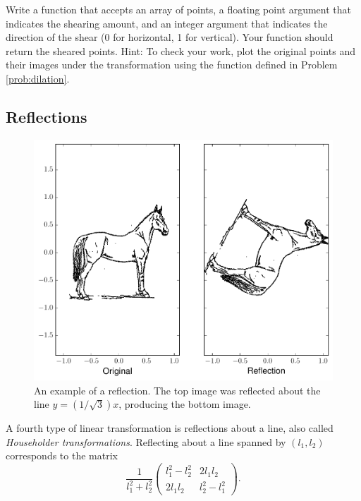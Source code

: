 \begin{problem}
Write a function that accepts an array of points, a floating point argument that indicates the shearing amount, and an integer argument that indicates the direction of the shear (0 for horizontal, 1 for vertical). 
Your function should return the sheared points. 
Hint: To check your work, plot the original points and their images under the transformation using the function  defined in Problem \ref{prob:dilation}.
\end{problem}

\subsection*{Reflections}%

\begin{figure}
\includegraphics[width=\textwidth]{reflect.pdf}
\caption{An example of a reflection. 
The top image was reflected about the line $y = (1/\sqrt{3})x$, producing the bottom image.}
\label{fig:reflect}
\end{figure}
A fourth type of linear transformation is reflections about a line, also called \emph{Householder transformations}. 
Reflecting about a line spanned by $(l_1, l_2)$ corresponds to the matrix
\[
\frac{1}{l_1^2 + l_2^2}
\begin{pmatrix}
l_1^2 - l_2^2 & 2l_1l_2 \\
2l_1l_2 & l_2^2 - l_1^2
\end{pmatrix}.
\]

